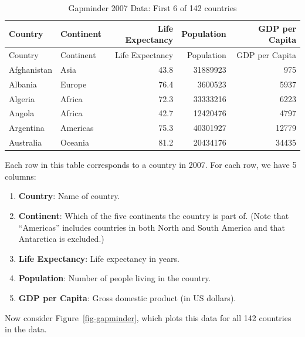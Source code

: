 \documentclass[
  letterpaper,
  DIV=11,
  numbers=noendperiod]{scrreprt}
\providecommand{\tightlist}{%
  \setlength{\itemsep}{0pt}\setlength{\parskip}{0pt}}\usepackage{longtable,booktabs,array}
\theoremstyle{definition}
\theoremstyle{remark}
\begin{document}
\hypertarget{tbl-gapminder-2007}{}
\begin{longtable}[]{@{}llrrr@{}}
\caption{\label{tbl-gapminder-2007}Gapminder 2007 Data: First 6 of 142
countries}\tabularnewline
\toprule\noalign{}
Country & Continent & Life Expectancy & Population & GDP per Capita \\
\midrule\noalign{}
\endfirsthead
\toprule\noalign{}
Country & Continent & Life Expectancy & Population & GDP per Capita \\
\midrule\noalign{}
\endhead
\bottomrule\noalign{}
\endlastfoot
Afghanistan & Asia & 43.8 & 31889923 & 975 \\
Albania & Europe & 76.4 & 3600523 & 5937 \\
Algeria & Africa & 72.3 & 33333216 & 6223 \\
Angola & Africa & 42.7 & 12420476 & 4797 \\
Argentina & Americas & 75.3 & 40301927 & 12779 \\
Australia & Oceania & 81.2 & 20434176 & 34435 \\
\end{longtable}

Each row in this table corresponds to a country in 2007. For each row,
we have 5 columns:

\begin{enumerate}
\def\labelenumi{\arabic{enumi}.}
\tightlist
\item
  \textbf{Country}: Name of country.
\item
  \textbf{Continent}: Which of the five continents the country is part
  of. (Note that ``Americas'' includes countries in both North and South
  America and that Antarctica is excluded.)
\item
  \textbf{Life Expectancy}: Life expectancy in years.
\item
  \textbf{Population}: Number of people living in the country.
\item
  \textbf{GDP per Capita}: Gross domestic product (in US dollars).
\end{enumerate}

Now consider Figure~\ref{fig-gapminder}, which plots this data for all
142 countries in the data.
\end{document}
